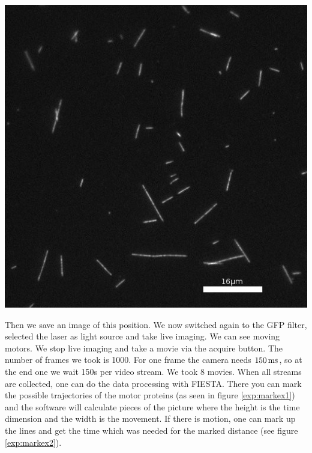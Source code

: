         \begin{center}
             \includegraphics[scale=0.4]{pic/exampleMT.jpeg}  
             \label{exp:mts}
        \end{center}
        Then we save an image of this position. We now switched again to the GFP filter, selected the laser as light source and take live imaging. We can see moving motors. We stop live imaging and take a movie via the acquire button. The number of frames we took is 1000. 
        For one frame the camera needs $\unit[150]{ms}$, so at the end one we wait 150s per video stream. We took 8 movies. 
        When all streams are collected, one can do the data processing with FIESTA. There you can mark the possible trajectories of the motor proteins (as seen in figure \ref{exp:markex1}) and the software will calculate pieces of the picture where the height is the time dimension and the width is the movement. If there is motion, one can mark up the lines and get the time which was needed for the marked distance (see figure \ref{exp:markex2}).
